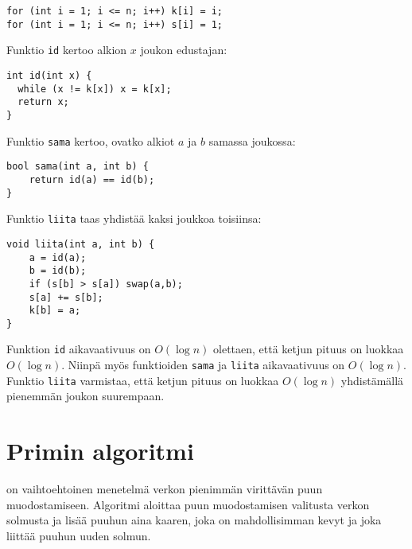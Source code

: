 \begin{lstlisting}
for (int i = 1; i <= n; i++) k[i] = i;
for (int i = 1; i <= n; i++) s[i] = 1;
\end{lstlisting}

Funktio \texttt{id} kertoo alkion $x$
joukon edustajan:

\begin{lstlisting}
int id(int x) {
  while (x != k[x]) x = k[x];
  return x;
}
\end{lstlisting}

Funktio \texttt{sama} kertoo,
ovatko alkiot $a$ ja $b$ samassa joukossa:

\begin{lstlisting}
bool sama(int a, int b) {
    return id(a) == id(b);
}
\end{lstlisting}

Funktio \texttt{liita} taas yhdistää
kaksi joukkoa toisiinsa:

\begin{lstlisting}
void liita(int a, int b) {
    a = id(a);
    b = id(b);
    if (s[b] > s[a]) swap(a,b);
    s[a] += s[b];
    k[b] = a;
}
\end{lstlisting}

Funktion \texttt{id} aikavaativuus on $O(\log n)$
olettaen, että ketjun pituus on luokkaa $O(\log n)$.
Niinpä myös funktioiden \texttt{sama} ja \texttt{liita}
aikavaativuus on $O(\log n)$.
Funktio \texttt{liita} varmistaa,
että ketjun pituus on luokkaa $O(\log n)$
yhdistämällä pienemmän joukon suurempaan.

% 
% 

\section{Primin algoritmi}


 on vaihtoehtoinen menetelmä
verkon pienimmän virittävän puun muodostamiseen.
Algoritmi aloittaa puun muodostamisen valitusta
verkon solmusta ja lisää puuhun aina kaaren,
joka on mahdollisimman kevyt ja joka
liittää puuhun uuden solmun.

